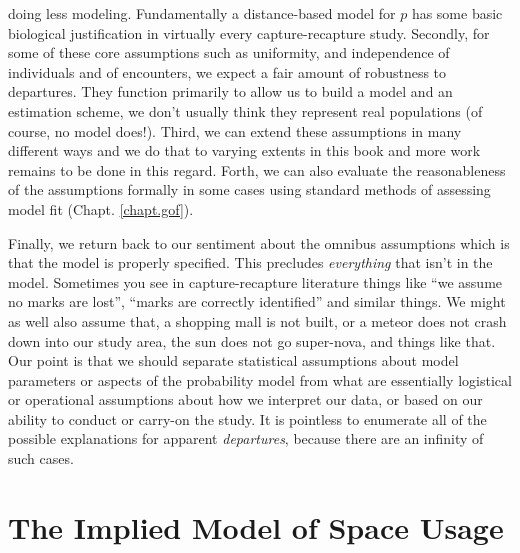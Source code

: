 doing less modeling.  Fundamentally a distance-based model for $p$ has
some basic biological justification in virtually every
capture-recapture study.  Secondly, for some of these core
assumptions such as uniformity, and
independence of individuals and of encounters, we expect a fair amount
of robustness to departures. They function primarily to allow us to
build a model and an estimation scheme, we don't usually think they represent
real populations (of course, no model does!).
Third, we can extend these assumptions
in many different ways and we do that to varying extents in this book
and more work remains to be done in this regard.  Forth, we can also
evaluate the reasonableness of the assumptions formally in some cases
using standard methods of assessing model fit
(Chapt. \ref{chapt.gof}).



Finally, we return back to our sentiment about the omnibus assumptions
which is that the model is properly specified. This precludes {\it
  everything} that isn't in the model. Sometimes you see in
capture-recapture literature things like ``we assume no marks are
lost'', ``marks are correctly identified'' and similar things. We
might as well also assume that, a shopping mall is not built, or a
meteor does not crash down into our study area, the sun does not go
super-nova, and things like that. Our point is that we should separate
statistical assumptions about model parameters or aspects of the
probability model from what are essentially logistical or operational
assumptions about how we interpret our data, or based on our ability
to conduct or carry-on the study.
It is pointless to enumerate all of the possible
explanations for apparent {\it departures}, because there are an
infinity of such cases.



\section{The Implied Model of Space Usage}
\label{scr0.sec.implied}


